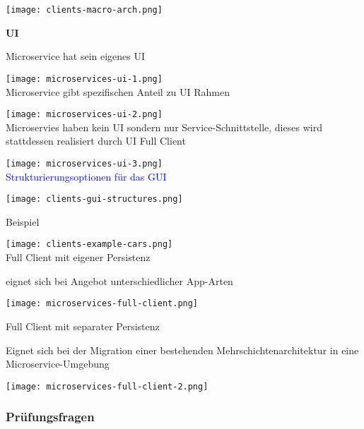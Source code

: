 \texttt{[image: clients-macro-arch.png]} \\

\vfill\null
\columnbreak

\textbf{UI}

Microservice hat sein eigenes UI

\texttt{[image: microservices-ui-1.png]} \\

Microservice gibt spezifischen Anteil zu UI Rahmen

\texttt{[image: microservices-ui-2.png]} \\

Microservies haben kein UI sondern nur Service-Schnittstelle, dieses wird stattdessen realisiert durch UI Full Client

\texttt{[image: microservices-ui-3.png]} \\

\textcolor{blue}{Strukturierungsoptionen für das GUI}

\texttt{[image: clients-gui-structures.png]}


\vfill\null
\columnbreak

Beispiel

\texttt{[image: clients-example-cars.png]} \\

Full Client mit eigener Persistenz

eignet sich bei Angebot unterschiedlicher App-Arten

\texttt{[image: microservices-full-client.png]}

Full Client mit separater Persistenz

Eignet sich bei der Migration einer bestehenden Mehrschichtenarchitektur in eine Microservice-Umgebung

\texttt{[image: microservices-full-client-2.png]}

\columnbreak

\vfill\null

\columnbreak

\subsubsection{Prüfungsfragen}

